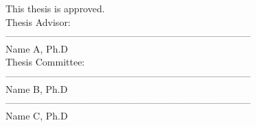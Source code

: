 \begin{flushleft}
  \vspace*{.25 in}
    This thesis is approved. \\
  \vspace{.5 in}
    Thesis Advisor: \\
  \vspace{.75 in}
    ----------------------------------------------------------------------------- \\
    Name A, Ph.D \\
  \vspace{.75 in}
    Thesis Committee: \\
  \vspace{.75 in}
    ----------------------------------------------------------------------------- \\
    Name B, Ph.D \\
  \vspace{.75 in}
    ----------------------------------------------------------------------------- \\
    Name C, Ph.D \\
\end{flushleft}

